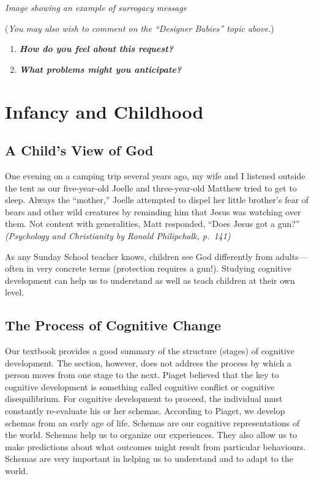 \documentclass[
]{book}
\providecommand{\tightlist}{%
  \setlength{\itemsep}{0pt}\setlength{\parskip}{0pt}}
\begin{document}
\begin{reflect}
\emph{Image showing an example of surrogacy message }

(\emph{You may also wish to comment on the ``Designer Babies'' topic above.})

\begin{enumerate}
\def\labelenumi{\arabic{enumi}.}
\tightlist
\item
  \textbf{\emph{How do you feel about this request?}}
\item
  \textbf{\emph{What problems might you anticipate?}}
\end{enumerate}
\end{reflect}

\hypertarget{infancy-and-childhood}{%
\section{Infancy and Childhood}\label{infancy-and-childhood}}

\hypertarget{a-childs-view-of-god}{%
\subsection*{A Child's View of God}\label{a-childs-view-of-god}}

One evening on a camping trip several years ago, my wife and I listened outside the tent as our five-year-old Joelle and three-year-old Matthew tried to get to sleep. Always the ``mother,'' Joelle attempted to dispel her little brother's fear of bears and other wild creatures by reminding him that Jesus was watching over them. Not content with generalities, Matt responded, ``Does Jesus got a gun?'' \emph{(Psychology and Christianity by Ronald Philipchalk, p.~141)}

As any Sunday School teacher knows, children see God differently from adults---often in very concrete terms (protection requires a gun!). Studying cognitive development can help us to understand as well as teach children at their own level.

\hypertarget{the-process-of-cognitive-change}{%
\subsection*{The Process of Cognitive Change}\label{the-process-of-cognitive-change}}

Our textbook provides a good summary of the structure (stages) of cognitive development. The section, however, does not address the process by which a person moves from one stage to the next. Piaget believed that the key to cognitive development is something called cognitive conflict or cognitive disequilibrium. For cognitive development to proceed, the individual must constantly re-evaluate his or her schemas. According to Piaget, we develop schemas from an early age of life. Schemas are our cognitive representations of the world. Schemas help us to organize our experiences. They also allow us to make predictions about what outcomes might result from particular behaviours. Schemas are very important in helping us to understand and to adapt to the world.
\end{document}
